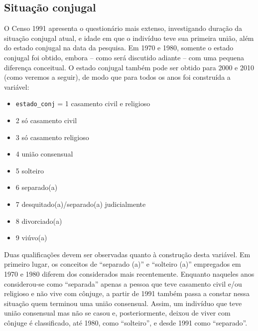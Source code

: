 \documentclass[12pt,a4paper]{article}
\newcommand{\vr}[1]{\texttt{#1}}
\begin{document}
\subsection{Situação conjugal}\label{sec:d9}
O Censo 1991 apresenta o questionário mais extenso, investigando duração da situação conjugal atual, e idade em que o indivíduo teve sua primeira união, além do estado conjugal na data da pesquisa. Em 1970 e 1980, somente o estado conjugal foi obtido, embora -- como será discutido adiante -- com uma pequena diferença conceitual. O estado conjugal também pode ser obtido para 2000 e 2010 (como veremos a seguir), de modo que para todos os anos foi construída a variável:
\begin{itemize}
  \item \vr{estado\_conj} = 1 casamento civil e religioso
  \item 2 só casamento civil
  \item 3 só casamento religioso
  \item 4 união consensual
  \item 5 solteiro
  \item 6 separado(a)
  \item 7 desquitado(a)/separado(a) judicialmente
  \item 8 divorciado(a)
  \item 9 viúvo(a)
\end{itemize}

Duas qualificações devem ser observadas quanto à construção desta variável. Em primeiro lugar, os conceitos de “separado (a)” e “solteiro (a)” empregados em 1970 e 1980 diferem dos considerados mais recentemente. Enquanto naqueles anos considerou-se como “separada” apenas a pessoa que teve casamento civil e/ou religioso e não vive com cônjuge, a partir de 1991 também passa a constar nessa situação quem terminou uma união consensual. Assim, um indivíduo que teve união consensual mas não se casou e, posteriormente, deixou de viver com cônjuge é classificado, até 1980, como “solteiro”, e desde 1991 como “separado”.
\end{document}
